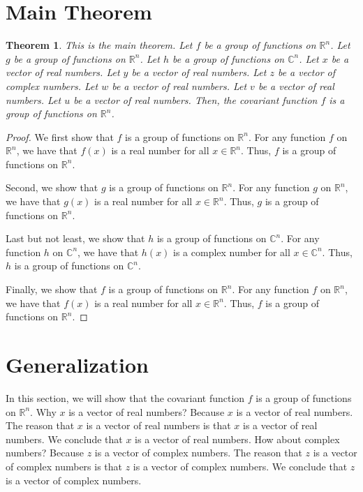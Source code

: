 \documentclass{article}
\newtheorem{theorem}{Theorem}
\begin{document}
\section{Main Theorem}


\begin{theorem}
    This is the main theorem. Let $f$ be a group of functions on $\mathbb{R}^n$. Let $g$ be a group of functions on $\mathbb{R}^n$. Let $h$ be a group of functions on $\mathbb{C}^n$. Let $x$ be a vector of real numbers. Let $y$ be a vector of real numbers. Let $z$ be a vector of complex numbers. Let $w$ be a vector of real numbers. Let $v$ be a vector of real numbers. Let $u$ be a vector of real numbers. Then, the covariant function $f$ is a group of functions on $\mathbb{R}^n$.
\end{theorem}

\begin{proof}
    We first show that $f$ is a group of functions on $\mathbb{R}^n$. For any function $f$ on $\mathbb{R}^n$, we have that $f(x)$ is a real number for all $x \in \mathbb{R}^n$. Thus, $f$ is a group of functions on $\mathbb{R}^n$. 

    Second, we show that $g$ is a group of functions on $\mathbb{R}^n$. For any function $g$ on $\mathbb{R}^n$, we have that $g(x)$ is a real number for all $x \in \mathbb{R}^n$. Thus, $g$ is a group of functions on $\mathbb{R}^n$.

    Last but not least, we show that $h$ is a group of functions on $\mathbb{C}^n$. For any function $h$ on $\mathbb{C}^n$, we have that $h(x)$ is a complex number for all $x \in \mathbb{C}^n$. Thus, $h$ is a group of functions on $\mathbb{C}^n$.

    Finally, we show that $f$ is a group of functions on $\mathbb{R}^n$. For any function $f$ on $\mathbb{R}^n$, we have that $f(x)$ is a real number for all $x \in \mathbb{R}^n$. Thus, $f$ is a group of functions on $\mathbb{R}^n$.
\end{proof}

\section{Generalization}

In this section, we will show that the covariant function $f$ is a group of functions on $\mathbb{R}^n$. Why $x$ is a vector of real numbers? Because $x$ is a vector of real numbers. The reason that $x$ is a vector of real numbers is that $x$ is a vector of real numbers. We conclude that $x$ is a vector of real numbers. How about complex numbers? Because $z$ is a vector of complex numbers. The reason that $z$ is a vector of complex numbers is that $z$ is a vector of complex numbers. We conclude that $z$ is a vector of complex numbers.
\end{document}
